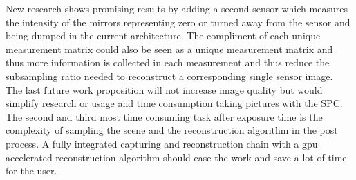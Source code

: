 New research shows promising results by adding a second sensor which measures the intensity of the mirrors representing zero or turned away from the sensor and being dumped in the current architecture. The compliment of each unique measurement matrix could also be seen as a unique measurement matrix and thus more information is collected in each measurement and thus reduce the subsampling ratio needed to reconstruct a corresponding single sensor image.\cite{article:nature_dual_sensor}\\[0.1in]

The last future work proposition will not increase image quality but would simplify research or usage and time consumption taking pictures with the SPC. The second and third most time consuming task after exposure time is the complexity of sampling the scene and the reconstruction algorithm in the post process. A fully integrated capturing and reconstruction chain with a gpu accelerated reconstruction algorithm should ease the work and save a lot of time for the user. 
 

